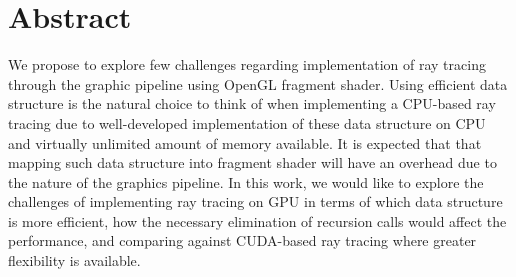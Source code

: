 \section{Abstract}
We propose to explore few challenges regarding implementation of ray tracing through the graphic pipeline using OpenGL fragment shader. Using efficient data structure is the natural choice to think of when implementing a CPU-based ray tracing due to well-developed implementation of these data structure on CPU and virtually unlimited amount of memory available. It is expected that that mapping such data structure into fragment shader will have an overhead due to the nature of the graphics pipeline. In this work, we would like to explore the challenges of implementing ray tracing on GPU in terms of which data structure is more efficient, how the necessary elimination of recursion calls would affect the performance, and comparing against CUDA-based ray tracing where greater flexibility is available.